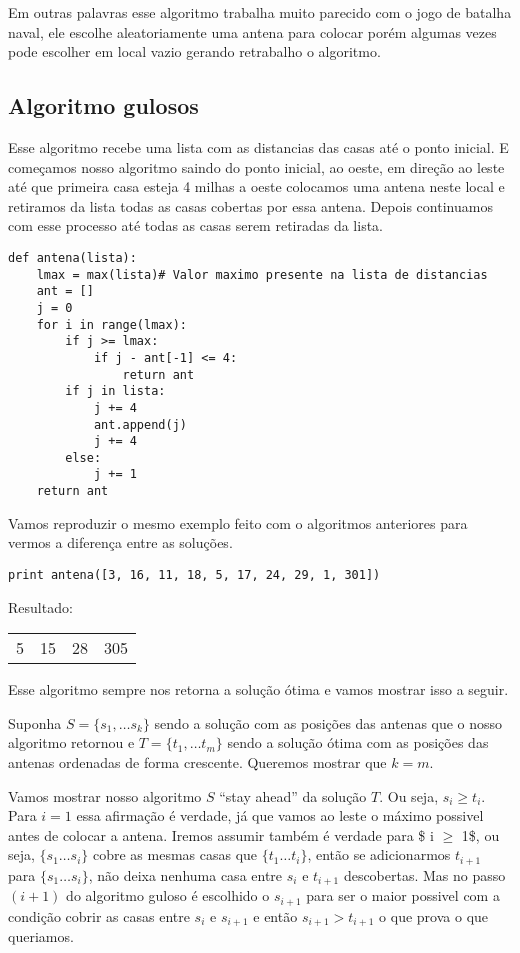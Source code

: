 \documentclass[11pt]{article}
\begin{document}
Em outras palavras esse algoritmo trabalha muito parecido com o jogo
de batalha naval, ele escolhe aleatoriamente uma antena para colocar
porém algumas vezes pode escolher em local vazio gerando retrabalho o
algoritmo.

\subsection{Algoritmo gulosos}
\label{sec-3-3}
\label{sec-3-3}

Esse algoritmo recebe uma lista com as distancias das casas até o
ponto inicial.  E começamos nosso algoritmo saindo do ponto inicial,
ao oeste, em direção ao leste até que primeira casa esteja 4 milhas a
oeste colocamos uma antena neste local e retiramos da lista todas as
casas cobertas por essa antena. Depois continuamos com esse processo
até todas as casas serem retiradas da lista.

\begin{verbatim}
def antena(lista):
    lmax = max(lista)# Valor maximo presente na lista de distancias
    ant = []
    j = 0
    for i in range(lmax):
        if j >= lmax:
            if j - ant[-1] <= 4:
                return ant
        if j in lista:
            j += 4
            ant.append(j)
            j += 4
        else:
            j += 1
    return ant
\end{verbatim}

Vamos reproduzir o mesmo exemplo feito com o algoritmos anteriores
para vermos a diferença entre as soluções.

\begin{verbatim}
print antena([3, 16, 11, 18, 5, 17, 24, 29, 1, 301])
\end{verbatim}

Resultado:
\begin{center}
\begin{tabular}{rrrr}
5 & 15 & 28 & 305\\
\end{tabular}
\end{center}

Esse algoritmo sempre nos retorna a solução ótima e vamos mostrar isso
a seguir.

Suponha $S = \{ s_1, \ldots s_k \}$ sendo a solução com as posições
das antenas que o nosso algoritmo retornou e $T = \{ t_1, \ldots t_m
\}$ sendo a solução ótima com as posições das antenas ordenadas de
forma crescente. Queremos mostrar que $k=m$.

Vamos mostrar nosso algoritmo $S$ ``stay ahead'' da solução $T$. Ou
seja, $s_i \geq t_i$.  Para $i = 1$ essa afirmação é verdade, já que
vamos ao leste o máximo possivel antes de colocar a antena.  Iremos
assumir também é verdade para \$ i $\ge$ 1\$, ou seja, $\{ s_1 \ldots s_i
\}$ cobre as mesmas casas que $\{ t_1 \ldots t_i \}$, então se
adicionarmos $t_{i+1}$ para $\{ s_1 \ldots s_i \}$, não deixa nenhuma
casa entre $s_i$ e $t_{i+1}$ descobertas.  Mas no passo $(i+1)$ do
algoritmo guloso é escolhido o $s_{i+1}$ para ser o maior possivel com
a condição cobrir as casas entre $s_i$ e $s_{i+1}$ e então $s_{i+1} >
t_{i+1}$ o que prova o que queriamos.
\end{document}
